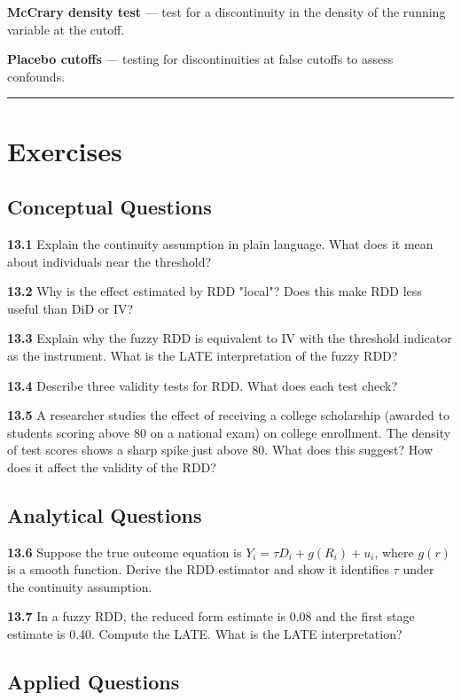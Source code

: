 \textbf{McCrary density test} --- test for a discontinuity in the density of the running variable at the cutoff.

\textbf{Placebo cutoffs} --- testing for discontinuities at false cutoffs to assess confounds.

\medskip\hrule\medskip

\section{Exercises}

\subsection{Conceptual Questions}

\textbf{13.1} Explain the continuity assumption in plain language. What does it mean about individuals near the threshold?

\textbf{13.2} Why is the effect estimated by RDD "local"? Does this make RDD less useful than DiD or IV?

\textbf{13.3} Explain why the fuzzy RDD is equivalent to IV with the threshold indicator as the instrument. What is the LATE interpretation of the fuzzy RDD?

\textbf{13.4} Describe three validity tests for RDD. What does each test check?

\textbf{13.5} A researcher studies the effect of receiving a college scholarship (awarded to students scoring above 80 on a national exam) on college enrollment. The density of test scores shows a sharp spike just above 80. What does this suggest? How does it affect the validity of the RDD?

\subsection{Analytical Questions}

\textbf{13.6} Suppose the true outcome equation is $Y_i = \tau D_i + g(R_i) + u_i$, where $g(r)$ is a smooth function. Derive the RDD estimator and show it identifies $\tau$ under the continuity assumption.

\textbf{13.7} In a fuzzy RDD, the reduced form estimate is 0.08 and the first stage estimate is 0.40. Compute the LATE. What is the LATE interpretation?

\subsection{Applied Questions}

